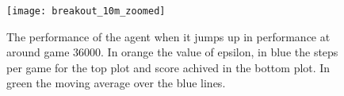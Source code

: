 \begin{figure}
    \texttt{[image: breakout\_10m\_zoomed]}
    \caption{The performance of the agent when it jumps up in performance at around game $36000$. In orange the value of epsilon, in blue the steps per game for the top plot and score achived in the bottom plot. In green the moving average over the blue lines.}
    \label{fig:breakout_10m_zoomed}
\end{figure}

